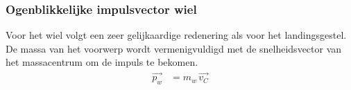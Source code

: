 \subsubsection{Ogenblikkelijke impulsvector wiel}
Voor het wiel volgt een zeer gelijkaardige redenering als voor het landingsgestel. De massa van het voorwerp wordt vermenigvuldigd met de snelheidsvector van het massacentrum om de impuls te bekomen. 
\begin{equation}
\begin{split}
\overrightarrow{{p}_{w}}
&=m_{w}\,\overrightarrow{{v}_{C}}
\end{split}
\end{equation}

